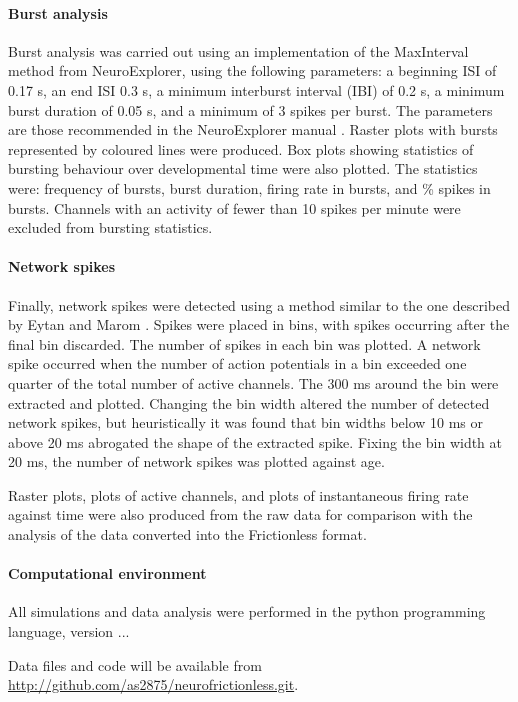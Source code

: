 \documentclass{bmcart}
\begin{document}
\paragraph{Burst analysis} Burst analysis was carried out using an implementation of the MaxInterval method from NeuroExplorer, using the following parameters: a beginning ISI of 0.17 s, an end ISI 0.3 s, a minimum interburst interval (IBI) of 0.2 s, a minimum burst duration of 0.05 s, and a minimum of 3 spikes per burst. The parameters are those recommended in the NeuroExplorer manual \cite{neuroexplorer2020}. Raster plots with bursts represented by coloured lines were produced. Box plots showing statistics of bursting behaviour over developmental time were also plotted. The statistics were: frequency of bursts, burst duration, firing rate in bursts, and \% spikes in bursts. Channels with an activity of fewer than 10 spikes per minute were excluded from bursting statistics.

\paragraph{Network spikes} Finally, network spikes were detected using a method similar to the one described by Eytan and Marom \cite{Eytan2006}. Spikes were placed in bins, with spikes occurring after the final bin discarded. The number of spikes in each bin was plotted. A network spike occurred when the number of action potentials in a bin exceeded one quarter of the total number of active channels. The 300 ms around the bin were extracted and plotted. Changing the bin width altered the number of detected network spikes, but heuristically it was found that bin widths below 10 ms or above 20 ms abrogated the shape of the extracted spike. Fixing the bin width at 20 ms, the number of network spikes was plotted against age.

\par Raster plots, plots of active channels, and plots of instantaneous firing rate against time were also produced from the raw data for comparison with the analysis of the data converted into the Frictionless format.


\paragraph{Computational environment} All simulations and data analysis were performed in the python programming
language, version ...

Data files and code will be available from
\url{http://github.com/as2875/neurofrictionless.git}.
\end{document}
